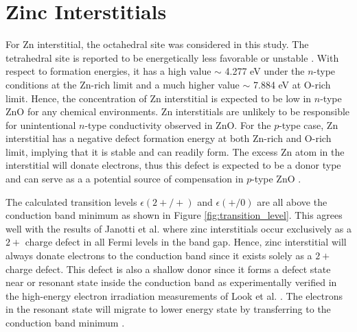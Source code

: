 \section{Zinc Interstitials}

For Zn interstitial, the octahedral site was considered in this study. The tetrahedral site is reported to be energetically less favorable or unstable \citep{Oba2001,Zhao2006,Oba2010}. With respect to formation energies, it has a high value   $\sim$ 4.277 eV under the $n$-type conditions at the  Zn-rich limit and a much higher value  $\sim$ 7.884 eV at O-rich limit. Hence, the concentration of Zn interstitial is expected to be low in $n$-type ZnO for any chemical environments. Zn interstitials are unlikely to be responsible for unintentional $n$-type conductivity observed in ZnO. For the $p$-type case, Zn interstitial has a negative defect formation energy at both Zn-rich and O-rich limit, implying that it is stable and can readily form. The excess Zn atom in the interstitial will donate electrons, thus this defect is expected to be a donor type and can serve as a a potential source of compensation in $p$-type ZnO \citep{Janotti2007}.

The calculated transition levels $\epsilon(2+/+)$ and $\epsilon(+/0)$ are all above the conduction band minimum as shown in Figure \ref{fig:transition_level}. This agrees well with the results of Janotti et al. \citep{Janotti2007} where zinc interstitials occur exclusively as a $2+$ charge defect in all Fermi levels in the band gap. Hence, zinc interstitial will always donate electrons to the conduction band since it exists solely as a $2+$ charge defect. This defect is also a shallow donor since it forms a  defect state near or resonant state inside the conduction band as experimentally verified in the high-energy electron irradiation measurements of Look et al. \citep{Look1999}. The electrons in the resonant state will 	migrate to lower energy state by transferring to the conduction band minimum \citep{Freysoldt2014}.

